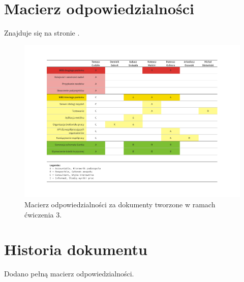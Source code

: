 \documentclass[10pt]{dokument-ppi}
\begin{document}
\Meta
{}
\MakeDokumentMeta


\section{Macierz odpowiedzialności}

Znajduje się na stronie \pageref{fig:macierz}.
\begin{figure}[h!]
    \includegraphics[trim=3cm 2cm 3cm 2cm,angle=90,width=\textwidth]{./figury/macierz-odpowiedzialnosci}
    \caption{Macierz odpowiedzialności za dokumenty tworzone w ramach ćwiczenia 3.}
    \label{fig:macierz}
\end{figure}


\section{Historia dokumentu}
\begin{versions}
        Dodano pełną macierz odpowiedzialności.
\end{versions}
\end{document}
